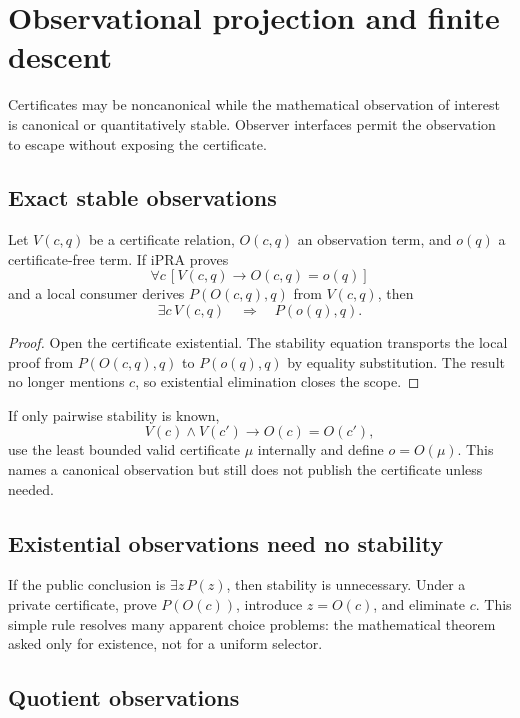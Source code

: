 \section{Observational projection and finite descent}
\label{sec:observers}

Certificates may be noncanonical while the mathematical observation of interest is canonical or quantitatively stable.  Observer interfaces permit the observation to escape without exposing the certificate.

\subsection{Exact stable observations}

\begin{theorem}
Let \(V(c,q)\) be a certificate relation, \(O(c,q)\) an observation term, and \(o(q)\) a certificate-free term.  If iPRA proves
\[
  \forall c\,[V(c,q)\to O(c,q)=o(q)]
\]
and a local consumer derives \(P(O(c,q),q)\) from \(V(c,q)\), then
\[
  \exists c\,V(c,q)\quad\Longrightarrow\quad P(o(q),q).
\]
\end{theorem}
\begin{proof}
Open the certificate existential.  The stability equation transports the local proof from \(P(O(c,q),q)\) to \(P(o(q),q)\) by equality substitution.  The result no longer mentions \(c\), so existential elimination closes the scope.
\end{proof}

If only pairwise stability is known,
\[
  V(c)\wedge V(c')\to O(c)=O(c'),
\]
use the least bounded valid certificate \(\mu\) internally and define \(o=O(\mu)\).  This names a canonical observation but still does not publish the certificate unless needed.

\subsection{Existential observations need no stability}

If the public conclusion is \(\exists z\,P(z)\), then stability is unnecessary.  Under a private certificate, prove \(P(O(c))\), introduce \(z=O(c)\), and eliminate \(c\).  This simple rule resolves many apparent choice problems: the mathematical theorem asked only for existence, not for a uniform selector.

\subsection{Quotient observations}

